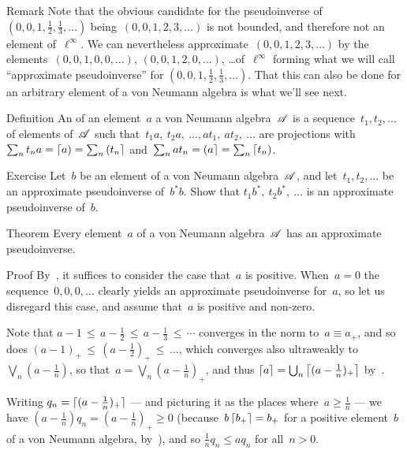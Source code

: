 \documentclass[a]{subfiles}
\begin{document}
\begin{parsec}%
\begin{point}{Remark}%
Note that the obvious candidate
for the pseudoinverse of~$(0,0,1,\frac{1}{2},\frac{1}{3},\dotsc)$
being~$(0,0,1,2,3,\dotsc)$
is not bounded,
and therefore not an element of~$\ell^\infty$.
We can nevertheless approximate~$(0,0,1,2,3,\dotsc)$
by the elements~$(0,0,1,0,0,\dotsc)$,
$(0,0,1,2,0,\dotsc)$, \dots of~$\ell^\infty$
forming what we will call ``approximate pseudoinverse'' for 
$(0,0,1,\frac{1}{2},\frac{1}{3},\dotsc)$.
That this can also be done for an arbitrary element
of a von Neumann algebra
is what we'll see next.
\end{point}
\begin{point}{Definition}%
An 
of an element~$a$ a von Neumann algebra~$\mathscr{A}$
is a sequence~$t_1,t_2,\dotsc$
of elements of~$\mathscr{A}$
such that~$t_1a,\ t_2a,\ \dotsc, at_1,\ at_2,\ \dotsc$
are projections with $\sum_n t_na = \left\lceil a\right)=\sum_n \left(t_n\right\rceil$
and~$\sum_n at_n =\left(a\right\rceil=\sum_n \left\lceil t_n\right)$.
\end{point}
\begin{point}{Exercise}%
Let~$b$ be an element of a von Neumann algebra~$\mathscr{A}$,
and let~$t_1,t_2,\dotsc$
be an approximate pseudoinverse
of~$b^*b$.
Show that $t_1b^*,\ t_2b^*,\ \dotsc$
is an approximate pseudoinverse of~$b$.
\end{point}
\begin{point}{Theorem}%
Every element~$a$ of a von Neumann algebra~$\mathscr{A}$
has an approximate pseudoinverse.
\begin{point}{Proof}%
By~,
it suffices to consider the case that~$a$ is positive.
When~$a=0$ the sequence~$0,0,0,\dotsc$
clearly yields an approximate pseudoinverse for~$a$,
so let us disregard this case,
and assume that~$a$ is positive and non-zero.

Note that $a-1 \,\leq\, a-\frac{1}{2}\,\leq\, a - \frac{1}{3}\,\leq\, \dotsb$
converges in the norm to~$a\equiv a_+$,
and so does $(a-1)_+\,\leq\,(a-\frac{1}{2})_+\,\leq\,\dotsc$,
which converges also ultraweakly to~$\bigvee_n(a-\frac{1}{n})$,
so that~$a=\bigvee_n (a-\frac{1}{n})_+$,
and thus $\left\lceil a\right\rceil=\bigcup_n \left\lceil(a-\frac{1}{n})_+\right\rceil$
by~.

Writing $q_n=
\left\lceil\smash{(a-\frac{1}{n})_+}\right\rceil$
--- and picturing it as the places where~$a\geq \frac{1}{n}$ ---
we have $(a-\frac{1}{n})q_n = (a-\frac{1}{n})_+\geq 0$
(because~$b\left\lceil b_+\right\rceil=b_+$
for a positive element~$b$ of a von Neumann algebra,
by~),
and so $\frac{1}{n}q_n \leq  aq_n$ for all~$n>0$.


\end{point}
\end{point}
\end{parsec}
\end{document}
